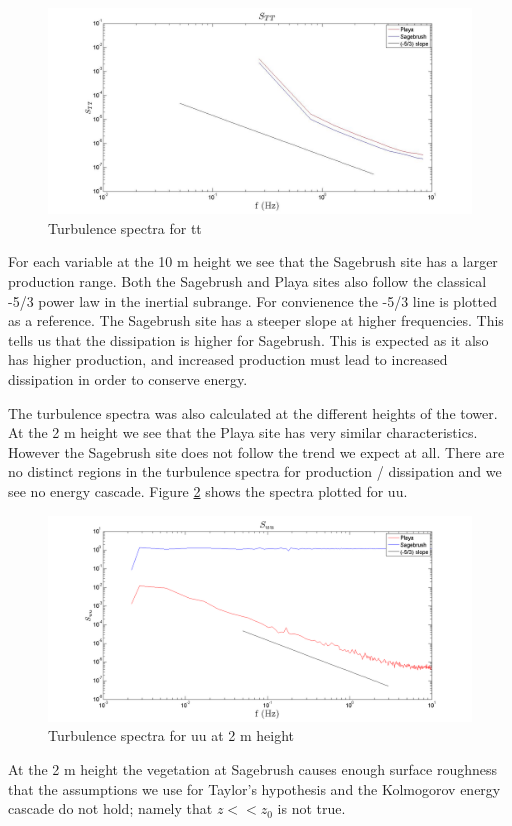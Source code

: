 \documentclass[]{article}
\begin{document}
\begin{figure}[h]
	\centering
	\includegraphics[width=\textwidth]{S_tt10m.jpg}
	\caption{Turbulence spectra for tt}
	\label{fig:S_tt10m}
\end{figure}

For each variable at the 10 m height we see that the Sagebrush site has a larger production range. Both the Sagebrush and Playa sites also follow the classical -5/3 power law in the inertial subrange. For convienence the -5/3 line is plotted as a reference. The Sagebrush site has a steeper slope at higher frequencies. This tells us that the dissipation is higher for Sagebrush. This is expected as it also has higher production, and increased production must lead to increased dissipation in order to conserve energy.

The turbulence spectra was also calculated at the different heights of the tower. At the 2 m height we see that the Playa site has very similar characteristics.  However the Sagebrush site does not follow the trend we expect at all. There are no distinct regions in the turbulence spectra for production / dissipation and we see no energy cascade. Figure \ref{fig:S_uu} shows the spectra plotted for uu.
\begin{figure}[h]
	\centering
	\includegraphics[width=\textwidth]{S_uu.png}
	\caption{Turbulence spectra for uu at 2 m height}
	\label{fig:S_uu}
\end{figure}
At the 2 m height the vegetation at Sagebrush causes enough surface roughness that the assumptions we use for Taylor's hypothesis and the Kolmogorov energy cascade do not hold; namely that $z << z_0$ is not true. 
\end{document}
